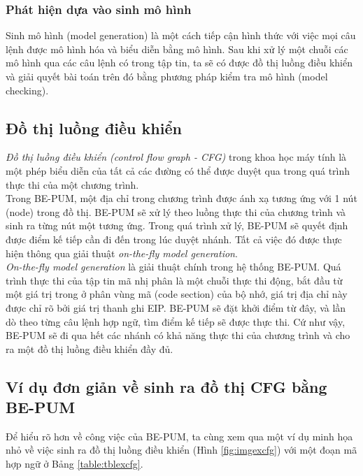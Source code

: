 		\subsubsection{Phát hiện dựa vào sinh mô hình}

Sinh mô hình (model generation) là một cách tiếp cận hình thức với việc mọi câu lệnh được mô hình hóa và biểu diễn bằng mô hình. Sau khi xử lý một chuỗi các mô hình qua các câu lệnh có trong tập tin, ta sẽ có được đồ thị luồng điều khiển và giải quyết bài toán trên đó bằng phương pháp kiểm tra mô hình (model checking).

	\subsection{Đồ thị luồng điều khiển}

\textit{Đồ thị luồng điều khiển (control flow graph - CFG)} trong khoa học máy tính là một phép biểu diễn của tất cả các đường có thể được duyệt qua trong quá trình thực thi của một chương trình. \cite{cfg-def}\\

Trong BE-PUM, một địa chỉ trong chương trình được ánh xạ tương ứng với 1 nút (node) trong đồ thị. BE-PUM sẽ xử lý theo luồng thực thi của chương trình và sinh ra từng nút một tương ứng. Trong quá trình xử lý, BE-PUM sẽ quyết định được điểm kế tiếp cần đi đến trong lúc duyệt nhánh. Tất cả việc đó được thực hiện thông qua giải thuật \textit{on-the-fly model generation}.\\

\textit{On-the-fly model generation} là giải thuật chính trong hệ thống BE-PUM. Quá trình thực thi của tập tin mã nhị phân là một chuỗi thực thi động, bắt đầu từ một giá trị trong ở phân vùng mã (code section) của bộ nhớ, giá trị địa chỉ này được chỉ rõ bởi giá trị thanh ghi EIP. BE-PUM sẽ đặt khởi điểm từ đây, và lần dò theo từng câu lệnh hợp ngữ, tìm điểm kế tiếp sẽ được thực thi. Cứ như vậy, BE-PUM sẽ đi qua hết các nhánh có khả năng thực thi của chương trình và cho ra một đồ thị luồng điều khiển đầy đủ.

	\subsection{Ví dụ đơn giản về sinh ra đồ thị CFG bằng BE-PUM}

Để hiểu rõ hơn về công việc của BE-PUM, ta cùng xem qua một ví dụ minh họa nhỏ về việc sinh ra đồ thị luồng điều khiển (Hình \ref{fig:imgexcfg}) với một đoạn mã hợp ngữ ở Bảng \ref{table:tblexcfg}.

